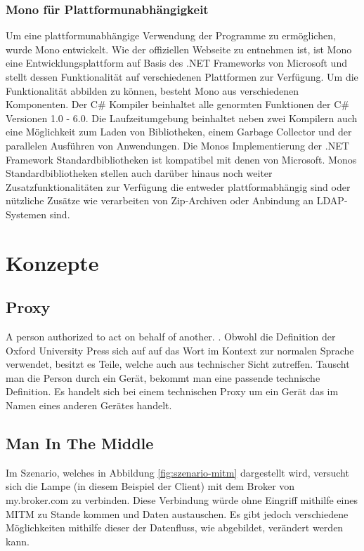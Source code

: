     \subsubsection{Mono für Plattformunabhängigkeit}
        Um eine plattformunabhängige Verwendung der Programme zu ermöglichen, wurde Mono entwickelt.
        Wie der offiziellen Webseite \cite{mono_project_2018} zu entnehmen ist, ist Mono eine Entwicklungsplattform auf Basis des .NET Frameworks von Microsoft und stellt dessen Funktionalität auf verschiedenen Plattformen zur Verfügung. Um die Funktionalität abbilden zu können, besteht Mono aus verschiedenen Komponenten.
        Der C\# Kompiler beinhaltet alle genormten Funktionen der C\# Versionen 1.0 - 6.0.
        Die Laufzeitumgebung beinhaltet neben zwei Kompilern auch eine Möglichkeit zum Laden von Bibliotheken, einem Garbage Collector und der parallelen Ausführen von Anwendungen.
        Die Monos Implementierung der .NET Framework Standardbibliotheken ist kompatibel mit denen von Microsoft.
        Monos Standardbibliotheken stellen auch darüber hinaus noch weiter Zusatzfunktionalitäten zur Verfügung die entweder plattformabhängig sind oder nützliche Zusätze wie verarbeiten von Zip-Archiven oder Anbindung an LDAP-Systemen sind.

\section{Konzepte}
    \subsection{Proxy}
    \glqq A person authorized to act on behalf of another.\grqq{} \cite{oxford_university_press_2019}.
    Obwohl die Definition der Oxford University Press sich auf auf das Wort im Kontext zur normalen Sprache verwendet, besitzt es Teile, welche auch aus technischer Sicht zutreffen. Tauscht man die Person durch ein Gerät, bekommt man eine passende technische Definition. Es handelt sich bei einem technischen Proxy um ein Gerät das im Namen eines anderen Gerätes handelt.

    \subsection{Man In The Middle}
        Im Szenario, welches in Abbildung \ref{fig:szenario-mitm} dargestellt wird, versucht sich die Lampe (in diesem Beispiel der Client) mit dem Broker von \glqq my.broker.com\grqq{} zu verbinden. Diese Verbindung würde ohne Eingriff mithilfe eines \ac{MITM} zu Stande kommen und Daten austauschen. Es gibt jedoch verschiedene Möglichkeiten mithilfe dieser der Datenfluss, wie abgebildet, verändert werden kann.
